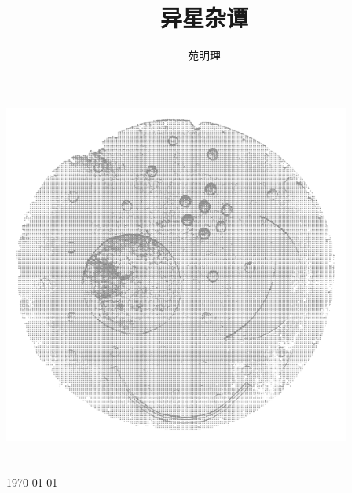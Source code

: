 \documentclass[a4paper,10.5pt]{article}
\title{异星杂谭}
\author{苑明理}
\date{}
\begin{document}

\makeatletter
    \begin{titlepage}
        \begin{center}
            \includegraphics[width=4.5in]{images/0_00-Cover.png}\\[10ex]
            {\erhao \bfseries  \@title }\\[50ex]
            {\sanhao  \@author}\\[5ex]
            {\sihao \monthyeardate\today}\\[1ex]
        \end{center}
    \end{titlepage}
\makeatother
\thispagestyle{empty}
\newpage

\newpage
\thispagestyle{empty}
\maketitle
\begin{center}
    \ccbysa
\end{center}
\thispagestyle{empty}

\newpage

\renewcommand\contentsname{目录}
\tableofcontents
\thispagestyle{empty}

\newpage

\setcounter{page}{1} %
\end{document}
